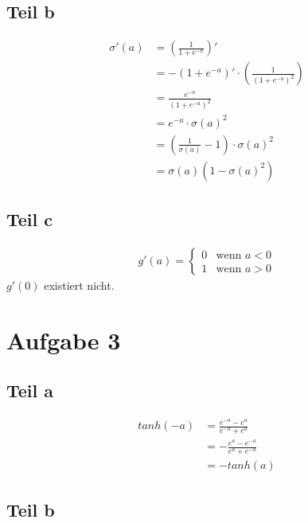 \documentclass[10pt,a4paper]{article}
\begin{document}
\subsection{Teil b}

\begin{align*}
  \sigma'(a) & = \left( \frac{1}{1 + e^{-a}} \right)'\\
             & = -\left( 1 + e^{-a} \right)' \cdot \left( \frac{1}{\left( 1 + e^{-a} \right)^{2}} \right)\\
             & = \frac{e^{-a}}{\left( 1 + e^{-a} \right)^{2}}\\
             & = e^{-a} \cdot \sigma(a)^{2}\\
             & = \left( \frac{1}{\sigma(a)} - 1 \right) \cdot \sigma(a)^{2}\\
             & = \sigma(a) \left( 1 - \sigma(a)^{2} \right)
\end{align*}

\subsection{Teil c}

\begin{align*}
  g'(a) = \begin{cases}
    0 & \text{wenn $a < 0$}\\
    1 & \text{wenn $a > 0$}
  \end{cases}
\end{align*}
$g'(0)$ existiert nicht.

\section{Aufgabe 3}

\subsection{Teil a}

\begin{align*}
  tanh(-a) & = \frac{e^{-a} - e^{a}}{e^{-a} + e^{a}}\\
           & = -\frac{e^{a} - e^{-a}}{e^{a} + e^{-a}}\\
           & = -tanh(a)
\end{align*}

\subsection{Teil b}
\end{document}
